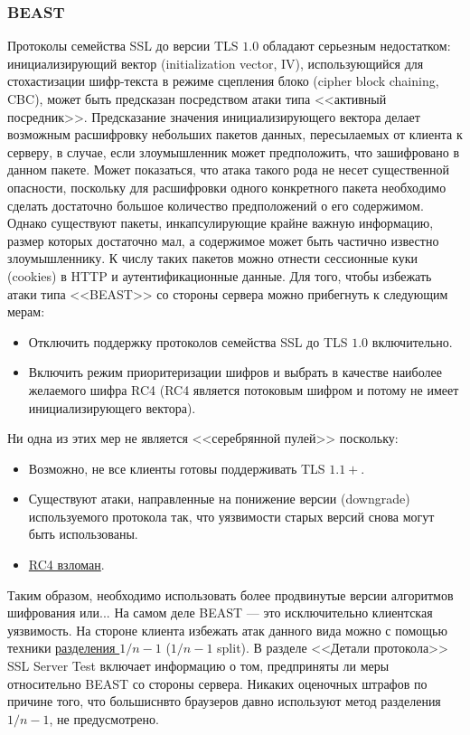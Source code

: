 \subsubsection{BEAST} \label{sssct:BEAST}

Протоколы семейства SSL до версии TLS $1.0$ обладают серьезным недостатком: инициализирующий вектор (initialization vector, IV),
использующийся для стохастизации шифр-текста в режиме сцепления блоко (cipher block chaining, CBC), может быть предсказан посредством
атаки типа <<активный посредник>>. Предсказание значения инициализирующего вектора делает возможным расшифровку небольших пакетов
данных, пересылаемых от клиента к серверу, в случае, если злоумышленник может предположить, что зашифровано в данном пакете. Может
показаться, что атака такого рода не несет существенной опасности, поскольку для расшифровки одного конкретного пакета необходимо
сделать достаточно большое количество предположений о его содержимом. Однако существуют пакеты, инкапсулирующие крайне важную 
информацию, 
размер которых достаточно мал, а содержимое может быть частично известно злоумышленнику. К числу таких пакетов можно отнести 
сессионные куки (cookies) в HTTP и аутентификационные данные. 
Для того, чтобы избежать атаки типа <<BEAST>> со стороны сервера можно
прибегнуть к следующим мерам:
\begin{itemize}
    \item Отключить поддержку протоколов семейства SSL до TLS $1.0$ включительно. 
    \item Включить режим приоритеризации шифров и выбрать в качестве наиболее желаемого шифра RC4 (RC4 является потоковым шифром и
        потому не имеет инициализирующего вектора).
\end{itemize}
Ни одна из этих мер не является <<серебрянной пулей>> поскольку:
\begin{itemize}
    \item Возможно, не все клиенты готовы поддерживать TLS $1.1+$.
    \item Существуют атаки, направленные на понижение версии (downgrade) используемого протокола так, что уязвимости старых версий
        снова могут быть использованы.
    \item \href{http://blog.cryptographyengineering.com/2013/03/attack-of-week-rc4-is-kind-of-broken-in.html}{RC4 взломан}.  
\end{itemize}
Таким образом, необходимо использовать более продвинутые версии алгоритмов шифрования или... 
На самом деле BEAST --- это исключительно клиентская уязвимость. На стороне клиента избежать атак данного вида можно с помощью 
техники \href{https://bugzilla.mozilla.org/show_bug.cgi?id=665814#c59}{разделения $1 / n - 1$} ($1 / n - 1$ split). 
В разделе 
<<Детали протокола>> SSL Server Test включает информацию о том, предприняты ли меры относительно BEAST со стороны сервера. Никаких 
оценочных штрафов по причине того, что большиснвто браузеров давно используют метод разделения $1 / n - 1$, не предусмотрено.

